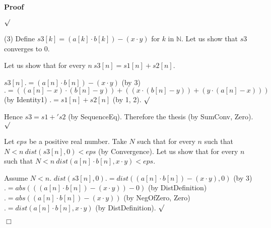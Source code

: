 \documentclass{article}
\newenvironment{forthel}{\begin{leftbar}}{\end{leftbar}}
\newenvironment{proof}{\noindent\textbf{Proof\ }}{\hspace*{\fill}$\Box$\medskip}
\newenvironment{subproof}{\begin{list}{}{}
		\item[\text{Proof}]}{\hfill $\surd$ \end{list}}
\newcommand{\NN}{\mathbb{N}}
\begin{document}
\begin{forthel}
\begin{proof}
\begin{subproof}
	\end{subproof}
	(3) Define $s3[k] = (a[k] \cdot b[k]) - (x \cdot y)$ for $k$ in $\NN$.
	Let us show that $s3$ converges to $0$.
	\begin{subproof}
	Let us show that for every $n \ s3[n] = s1[n] + s2[n]$.
	\begin{subproof}
	$s3[n] .= (a[n] \cdot b[n]) - (x \cdot y)$ (by 3)
	$.= ((a[n] - x) \cdot (b[n] - y)) + ((x \cdot (b[n] - y)) + (y \cdot (a[n] - x)))$ (by Identity1)
	$.= s1[n] + s2[n]$ (by 1, 2).
	\end{subproof}
	Hence $s3 = s1 +' s2$ (by SequenceEq).
	Therefore the thesis (by SumConv, Zero).
	\end{subproof}
	Let $eps$ be a positive real number.
	Take $N$ such that for every $n$ such that $N < n \ dist(s3[n],0) < eps$ (by Convergence).
	Let us show that for every $n$ such that $N < n \ dist(a[n] \cdot b[n],x \cdot y) < eps$.
	\begin{subproof}
	Assume $N < n$.
	$dist(s3[n],0) .= dist((a[n] \cdot b[n]) - (x \cdot y),0)$ (by 3)
	$.= abs(((a[n] \cdot b[n]) - (x \cdot y)) - 0)$ (by DistDefinition)
	$.= abs((a[n] \cdot b[n]) - (x \cdot y))$ (by NegOfZero, Zero)
	$.= dist(a[n] \cdot b[n],x \cdot y)$ (by DistDefinition).
	\end{subproof}
	\end{proof}


\end{forthel}
\end{document}
